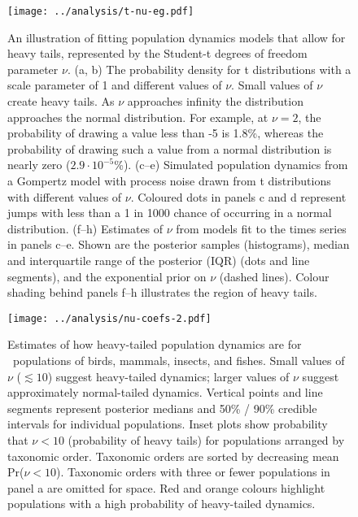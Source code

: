 \begin{figure}[htbp]
\begin{center}
\texttt{[image: ../analysis/t-nu-eg.pdf]}
\caption{
An illustration of fitting population dynamics models that allow for heavy
tails, represented by the Student-t degrees of freedom parameter $\nu$. (a, b)
The probability density for t distributions with a scale parameter of 1 and
different values of $\nu$. Small values of $\nu$ create heavy tails. As $\nu$
approaches infinity the distribution approaches the normal distribution. For
example, at $\nu = 2$, the probability of drawing a value less than -5 is
1.8\%, whereas the probability of drawing such a value from a normal
distribution is nearly zero ($2.9\cdot10^{-5}$\%). (c--e) Simulated population
dynamics from a Gompertz model with process noise drawn from t distributions
with different values of $\nu$. Coloured dots in panels c and d represent jumps
with less than a 1 in 1000 chance of occurring in a normal distribution. (f--h)
Estimates of $\nu$ from models fit to the times series in panels c--e. Shown
are the posterior samples (histograms), median and interquartile range of the
posterior (IQR) (dots and line segments), and the exponential prior on $\nu$
(dashed lines). Colour shading behind panels f--h illustrates the region of
heavy tails.}
\label{fig:didactic}
\end{center}
\end{figure}

\clearpage

\begin{figure}[htbp]
\begin{center}
\texttt{[image: ../analysis/nu-coefs-2.pdf]}
\caption{
Estimates of how heavy-tailed population dynamics are for \nuCoefPopN\
populations of birds, mammals, insects, and fishes. Small values of $\nu$
($\lesssim 10$) suggest heavy-tailed dynamics; larger values of $\nu$ suggest
approximately normal-tailed dynamics. Vertical points and line segments
represent posterior medians and 50\% / 90\% credible intervals for individual
populations. Inset plots show probability that $\nu < 10$ (probability of heavy
tails) for populations arranged by taxonomic order. Taxonomic orders are sorted
by decreasing mean Pr($\nu < 10$). Taxonomic orders with three or fewer
populations in panel a are omitted for space. Red and orange colours highlight
populations with a high probability of heavy-tailed dynamics.
}
\label{fig:nu-coefs}
\end{center}
\end{figure}

